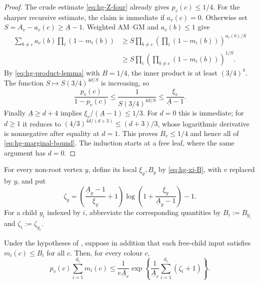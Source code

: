 \begin{proof}
The crude estimate \eqref{eq:hg-Z-four} already gives
\(p_v(c)\le1/4\).  For the sharper recursive estimate, the claim is
immediate if \(a_v(c)=0\).  Otherwise set
\(S=A_v-a_v(c)\ge\underline A-1\).  Weighted AM--GM and
\(a_v(b)\le1\) give
\begin{align*}
 \sum_{b\ne c}a_v(b)\prod_i(1-m_i(b))
 &\ge S\prod_{b\ne c}
       \left(\prod_i(1-m_i(b))\right)^{a_v(b)/S}\\
 &\ge S\prod_i
       \left(\prod_{b\ne c}(1-m_i(b))\right)^{1/S}.
\end{align*}
By \eqref{eq:hg-product-lemma} with $B=1/4$, the inner product is at
least $(3/4)^4$.  The function
\(S\mapsto S(3/4)^{4d/S}\) is increasing, so
\[
  \frac{p_v(c)}{1-p_v(c)}
  \le \frac1{S(3/4)^{4d/S}}
  \le \frac{\xi_v}{\underline A-1}.
\]
Finally \(\underline A\ge d+4\) implies
\(\xi_v/(\underline A-1)\le1/3\).  For $d=0$ this is immediate; for $d\ge1$
it reduces to
$(4/3)^{4d/(d+3)}\le(d+3)/3$, whose logarithmic derivative is
nonnegative after equality at $d=1$.  This proves $B_v\le1/4$ and hence all
of \eqref{eq:hg-marginal-bound}.  The induction starts at a free leaf, where
the same argument has $d=0$.
\end{proof}

For every non-root vertex $y$, define its local $\xi_y,B_y$ by
\eqref{eq:hg-xi-B}, with $v$ replaced by $y$, and put
\begin{equation}
  \zeta_y=
  \left(\frac{\underline A_y-1}{\xi_y}+1\right)
  \log\left(1+\frac{\xi_y}{\underline A_y-1}\right)-1.
  \label{eq:hg-zeta}
\end{equation}
For a child \(y_i\) indexed by \(i\), abbreviate the corresponding
quantities by \(B_i:=B_{y_i}\) and \(\zeta_i:=\zeta_{y_i}\).

\begin{lemma}
\label{lem:hg-continuous-amortized}
Under the hypotheses of , suppose in addition
that each free-child input satisfies $m_i(c)\le B_i$ for all $c$.  Then, for
every colour $c$,
\begin{equation}
  p_v(c)\sum_{i=1}^{d_v}m_i(c)
  \le \frac1{e\underline A_v}
       \exp\left\{
          \frac1{\underline A_v}\sum_{i=1}^{d_v}(\zeta_i+1)
       \right\}.
  \label{eq:hg-amortized}
\end{equation}
\end{lemma}

